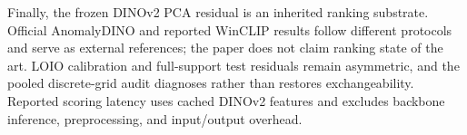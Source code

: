 Finally, the frozen DINOv2 PCA residual is an inherited ranking substrate. Official AnomalyDINO and reported WinCLIP results follow different protocols and serve as external references; the paper does not claim ranking state of the art. LOIO calibration and full-support test residuals remain asymmetric, and the pooled discrete-grid audit diagnoses rather than restores exchangeability. Reported scoring latency uses cached DINOv2 features and excludes backbone inference, preprocessing, and input/output overhead.
